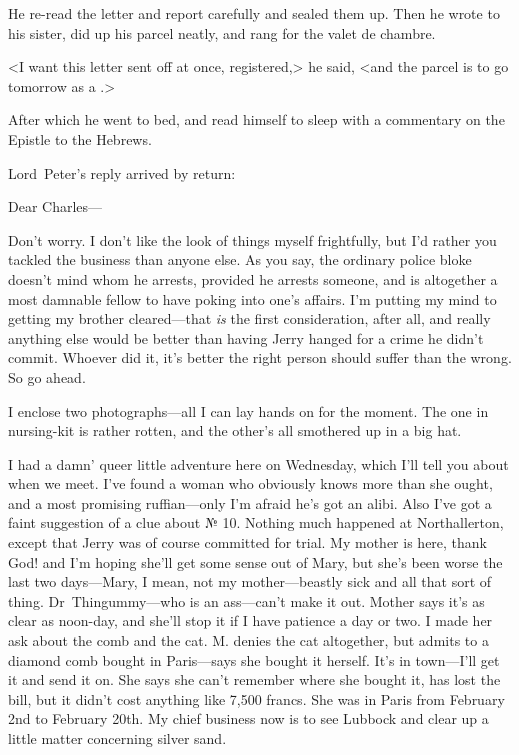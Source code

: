 He re-read the letter and report carefully and sealed them up. Then he wrote to his sister, did up his parcel neatly, and rang for the valet de chambre.

<I want this letter sent off at once, registered,> he said, <and the parcel is to go tomorrow as a .>

After which he went to bed, and read himself to sleep with a commentary on the Epistle to the Hebrews.

\divider

Lord~Peter's reply arrived by return:
\begin{a4}
	\vspace{-1em}
\end{a4}
\begin{mail}{}{Dear Charles---}

Don't worry. I don't like the look of things myself frightfully, but I'd rather you tackled the business than anyone else. As you say, the ordinary police bloke doesn't mind whom he arrests, provided he arrests someone, and is altogether a most damnable fellow to have poking into one's affairs. I'm putting my mind to getting my brother cleared—that \emph{is} the first consideration, after all, and really anything else would be better than having Jerry hanged for a crime he didn't commit. Whoever did it, it's better the right person should suffer than the wrong. So go ahead.

I enclose two photographs—all I can lay hands on for the moment. The one in nursing-kit is rather rotten, and the other's all smothered up in a big hat.

I had a damn' queer little adventure here on Wednesday, which I'll tell you about when we meet. I've found a woman who obviously knows more than she ought, and a most promising ruffian—only I'm afraid he's got an alibi. Also I've got a faint suggestion of a clue about № 10. Nothing much happened at Northallerton, except that Jerry was of course committed for trial. My mother is here, thank God! and I'm hoping she'll get some sense out of Mary, but she's been worse the last two days—Mary, I mean, not my mother—beastly sick and all that sort of thing. Dr~Thingummy—who is an ass—can't make it out. Mother says it's as clear as noon-day, and she'll stop it if I have patience a day or two. I made her ask about the comb and the cat. M\@. denies the cat altogether, but admits to a diamond comb bought in Paris—says she bought it herself. It's in town—I'll get it and send it on. She says she can't remember where she bought it, has lost the bill, but it didn't cost anything like 7,500 francs. She was in Paris from February 2nd to February 20th. My chief business now is to see Lubbock and clear up a little matter concerning silver sand.


\end{mail}
